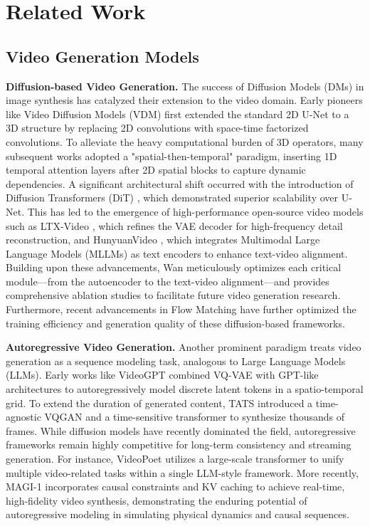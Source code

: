 \section{Related Work}

\subsection{Video Generation Models}
\textbf{Diffusion-based Video Generation.}
The success of Diffusion Models (DMs) \cite{ho2020denoising} in image synthesis has catalyzed their extension to the video domain. Early pioneers like Video Diffusion Models (VDM) {\cite{ho2022video}} first extended the standard 2D U-Net to a 3D structure \cite{wu2026geometry} by replacing 2D convolutions with space-time factorized convolutions. To alleviate the heavy computational burden of 3D operators, many subsequent works {\cite{singer2022make, ho2022imagen, wu2023tune, zhou2022magicvideo, wang2025lavie}} adopted a "spatial-then-temporal" paradigm, inserting 1D temporal attention layers after 2D spatial blocks to capture dynamic dependencies. 
A significant architectural shift occurred with the introduction of Diffusion Transformers (DiT) {\cite{peebles2023scalable}}, which demonstrated superior scalability over U-Net. This has led to the emergence of high-performance open-source video models such as LTX-Video {\cite{hacohen2024ltx}}, which refines the VAE decoder for high-frequency detail reconstruction, and HunyuanVideo {\cite{kong2024hunyuanvideo}}, which integrates Multimodal Large Language Models (MLLMs) as text encoders to enhance text-video alignment. Building upon these advancements, Wan {\cite{wan2025}} meticulously optimizes each critical module—from the autoencoder to the text-video alignment—and provides comprehensive ablation studies to facilitate future video generation research. Furthermore, recent advancements in Flow Matching {\cite{lipman2023flowmatching}} have further optimized the training efficiency and generation quality of these diffusion-based frameworks.

\textbf{Autoregressive Video Generation.} 
Another prominent paradigm treats video generation as a sequence modeling task, analogous to Large Language Models (LLMs). Early works like VideoGPT {\cite{yan2021videogpt}} combined VQ-VAE \cite{van2017neural} with GPT-like architectures \cite{radford2018improving} to autoregressively model discrete latent tokens in a spatio-temporal grid. To extend the duration of generated content, TATS {\cite{ge2022long}} introduced a time-agnostic VQGAN and a time-sensitive transformer to synthesize thousands of frames. While diffusion models have recently dominated the field, autoregressive frameworks remain highly competitive for long-term consistency and streaming generation. For instance, VideoPoet {\cite{kondratyuk2023videopoet}} utilizes a large-scale transformer to unify multiple video-related tasks within a single LLM-style framework. More recently, MAGI-1 {\cite{teng2025magi}} incorporates causal constraints and KV caching to achieve real-time, high-fidelity video synthesis, demonstrating the enduring potential of autoregressive modeling in simulating physical dynamics and causal sequences.

